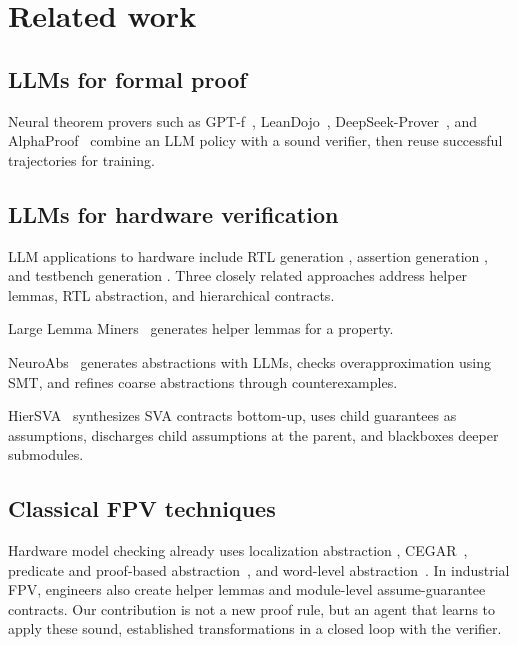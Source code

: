 \section{Related work}

\subsection{LLMs for formal proof}

Neural theorem provers such as GPT-f~\cite{polu2020gptf},
LeanDojo~\cite{yang2023leandojo}, DeepSeek-Prover~\cite{xin2024deepseekproverv15,ren2025deepseekproverv2},
and AlphaProof~\cite{deepmind2024alphaproof} combine an LLM policy with a
sound verifier, then reuse successful trajectories for training.

\subsection{LLMs for hardware verification}

LLM applications to hardware include RTL generation
\cite{liu2023verilogeval,liu2024rtlcoder}, assertion generation
\cite{fang2025assertllm,mali2024chiraag}, and testbench generation
\cite{qiu2024autobench}. Three closely related approaches address helper
lemmas, RTL abstraction, and hierarchical contracts.

Large Lemma Miners~\cite{peled2026lemmaminers} generates helper lemmas for a property.

NeuroAbs~\cite{yan2026neuroabs} generates abstractions with LLMs,
checks overapproximation using SMT, and refines coarse abstractions through
counterexamples.

HierSVA~\cite{hiersva2026} synthesizes SVA contracts bottom-up, uses
child guarantees as assumptions, discharges child assumptions at the parent,
and blackboxes deeper submodules.

\subsection{Classical FPV techniques}

Hardware model checking already uses localization abstraction
\cite{kurshan1994localization}, CEGAR~\cite{clarke2000cegar}, predicate and
proof-based abstraction~\cite{graf1997predicate,mcmillan2003proofbased}, and
word-level abstraction~\cite{goel2020avr,mann2021pono}. In industrial FPV,
engineers also create helper lemmas and module-level
assume-guarantee contracts. Our contribution is not a new proof rule, but an
agent that learns to apply these sound, established transformations in a
closed loop with the verifier.

